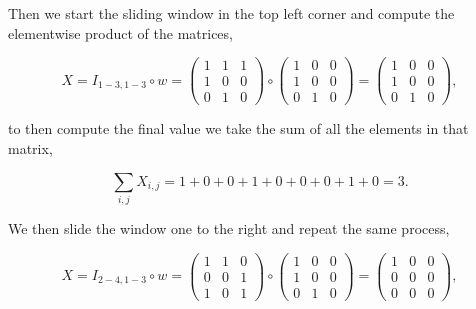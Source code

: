 \begin{description}
        Then we start the sliding window in the top left corner and compute the
        elementwise product of the matrices,

        \begin{equation}
            X = I_{1-3,1-3} \circ w =
            \begin{pmatrix}
                1 & 1 & 1 \\
                1 & 0 & 0 \\
                0 & 1 & 0
            \end{pmatrix} \circ
            \begin{pmatrix}
                1 & 0 & 0 \\
                1 & 0 & 0 \\
                0 & 1 & 0
            \end{pmatrix} =
            \begin{pmatrix}
                1 & 0 & 0 \\
                1 & 0 & 0 \\
                0 & 1 & 0
            \end{pmatrix},
        \end{equation}

        to then compute the final value we take the sum of all the elements in
        that matrix,

        \begin{equation}
            \sum_{i,j} X_{i,j} = 1 + 0 + 0 + 1 + 0 + 0 + 0 + 1 + 0 = 3.
        \end{equation}

        We then slide the window one to the right and repeat the same process,

        \begin{equation}
            X = I_{2-4,1-3} \circ w =
            \begin{pmatrix}
                1 & 1 & 0 \\
                0 & 0 & 1 \\
                1 & 0 & 1
            \end{pmatrix} \circ
            \begin{pmatrix}
                1 & 0 & 0 \\
                1 & 0 & 0 \\
                0 & 1 & 0
            \end{pmatrix} =
            \begin{pmatrix}
                1 & 0 & 0 \\
                0 & 0 & 0 \\
                0 & 0 & 0
            \end{pmatrix},
        \end{equation}


\end{description}
